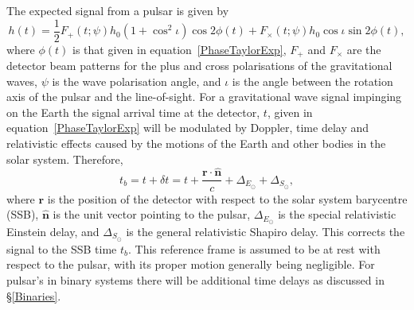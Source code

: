 The expected signal from a pulsar is given by
\begin{equation}\label{PulsarSignal}
h(t) = \frac{1}{2}F_+(t;\psi)h_0(1+\cos^2\iota)\cos{2\phi(t)} +
F_{\times}(t;\psi)h_0\cos{\iota}\sin{2\phi(t)},
\end{equation}
where $\phi(t)$ is that given in equation~\ref{PhaseTaylorExp}, $F_+$ and $F_{\times}$ are the
detector beam patterns for the plus and cross polarisations of the gravitational waves, $\psi$ is
the wave polarisation angle, and $\iota$ is the angle between the rotation axis of the pulsar and
the line-of-sight. For a gravitational wave signal impinging on the Earth the signal arrival time at
the detector, $t$, given in equation~\ref{PhaseTaylorExp} will be modulated by Doppler, time delay
and relativistic effects caused by the motions of the Earth and other bodies in the solar system.
Therefore,
\begin{equation}\label{TimeDelay}
t_b = t + \delta{}t = t + \frac{\mathbf{r}\cdot\hat{\mathbf{n}}}{c} + \Delta_{E_{\odot}} +
\Delta_{S_{\odot}}, 
\end{equation}
where $\mathbf{r}$ is the position of the detector with respect to the solar system barycentre
(SSB), $\hat{\mathbf{n}}$ is the unit vector pointing to the pulsar, $\Delta_{E_{\odot}}$ is the
special relativistic Einstein delay, and $\Delta_{S_{\odot}}$ is the general relativistic Shapiro
delay. This corrects the signal to the SSB time $t_b$. This reference frame is assumed to be at
rest with respect to the pulsar, with its proper motion generally being negligible. For pulsar's in
binary systems there will be additional time delays as discussed in \S\ref{Binaries}.

